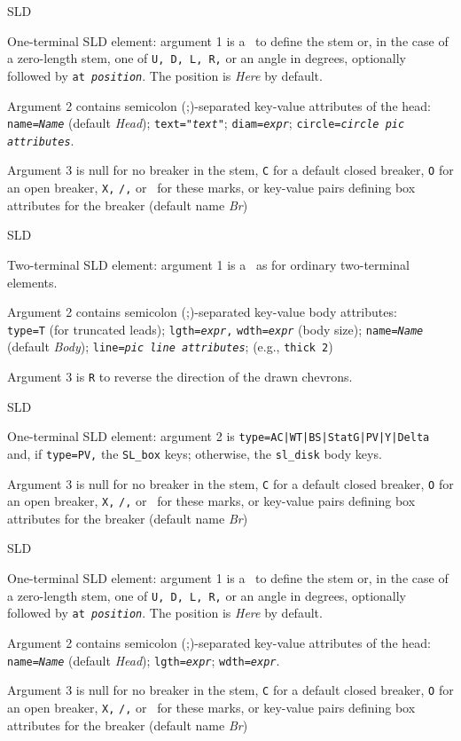 %
  {SLD}%
  {One-terminal SLD element: argument 1 is a \linespec\ to define the stem
   or, in the case of a zero-length stem, one of {\tt U, D, L, R,} or an
   angle in degrees, optionally followed by {\tt at {\sl position}}.
   The position is {\sl Here} by default.

   Argument 2 contains semicolon (;)-separated key-value attributes
   of the head:
   {\tt name={\sl{}Name}} (default {\sl Head});
   {\tt text="{\sl{}text}"};
   {\tt diam={\sl{}expr}};
   {\tt circle={\sl{}circle pic attributes}}.

   Argument 3 is null for no breaker in the stem, {\tt C} for a default
   closed breaker, {\tt O} for an open breaker, {\tt X,} {\tt /,} or \bsl\ for
   these marks, or
   key-value pairs defining box attributes for the breaker
   (default name {\sl Br})
   \label{sl_disk}
   }%
%
  {SLD}%
  {Two-terminal SLD element: argument 1 is a \linespec\ as for ordinary
   two-terminal elements.

   Argument 2 contains semicolon (;)-separated key-value body attributes:\\
   {\tt type=T} (for truncated leads);
   {\tt lgth={\sl{}expr},}
   {\tt wdth={\sl{}expr}} (body size);
   {\tt name={\sl{}Name}} (default {\sl Body});
   {\tt line={\sl{}pic line attributes}}; (e.g., {\tt thick 2})

   Argument 3 is {\tt R} to reverse the direction of the drawn chevrons.
   }%
%
  {SLD}%
  {One-terminal SLD element: argument 2 is
   {\tt type=AC|WT|BS|StatG|PV|Y|Delta} and,
   if {\tt type=PV,} the {\tt SL\_box} keys;
   otherwise, the {\tt sl\_disk} body keys.

   Argument 3 is null for no breaker in the stem, {\tt C} for a default
   closed breaker, {\tt O} for an open breaker, {\tt X,} {\tt /,} or \bsl\ for
   these marks, or
   key-value pairs defining box attributes for the breaker
   (default name {\sl Br})
   }%
%
  {SLD}%
  {One-terminal SLD element: argument 1 is a \linespec\ to define the stem
   or, in the case of a zero-length stem, one of {\tt U, D, L, R,} or an
   angle in degrees, optionally followed by {\tt at {\sl position}}.
   The position is {\sl Here} by default.

   Argument 2 contains semicolon (;)-separated key-value attributes
   of the head:
   {\tt name={\sl{}Name}} (default {\sl Head});
   {\tt lgth={\sl{}expr}};
   {\tt wdth={\sl{}expr}}.

   Argument 3 is null for no breaker in the stem, {\tt C} for a default
   closed breaker, {\tt O} for an open breaker, {\tt X,} {\tt /,} or \bsl\ for
   these marks, or
   key-value pairs defining box attributes for the breaker
   (default name {\sl Br})
   }%
